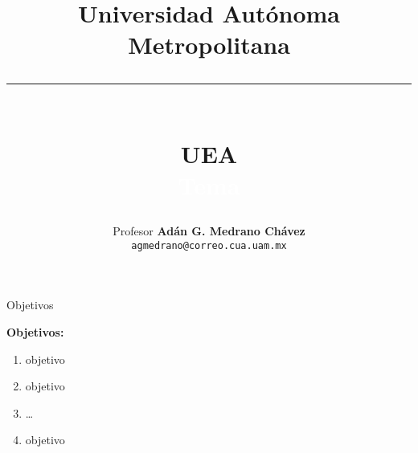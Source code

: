 \documentclass[table,dvipsnames,aspectratio=169]{beamer}
\title{{\LARGE Universidad Autónoma Metropolitana}\\
       \noindent\textcolor{Cua}{\rule{0.9\textwidth}{1mm}}\\
       {\large UEA}\\
       \textcolor{white}{Tema}\\
      }
\author[Adán G. Medrano-Chávez]{
    \small 
    Profesor \textbf{Adán G. Medrano Chávez}\\
    \texttt{agmedrano@correo.cua.uam.mx}
}
\date{}
\begin{document}
\begin{frame}[t,plain]
  \titlepage
\end{frame}

\begin{frame}{Objetivos}
    \begin{singlecol}[0.5]
        \textbf{Objetivos:}
        \begin{enumerate}
          \item objetivo
          \item objetivo
          \item \ldots
          \item objetivo
        \end{enumerate}
    \end{singlecol}
\end{frame}
\end{document}
